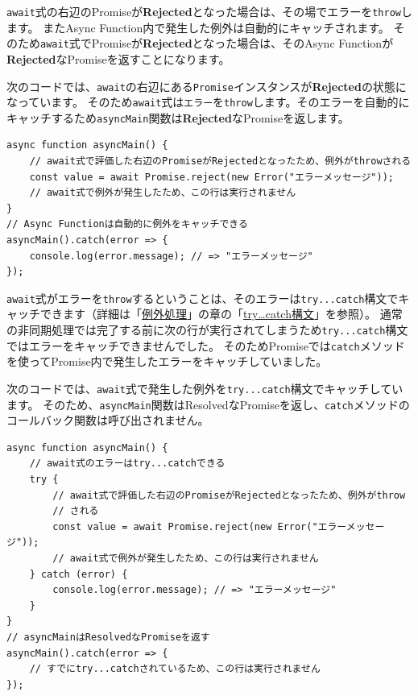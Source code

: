 \texttt{await}式の右辺のPromiseが\textbf{Rejected}となった場合は、その場でエラーを\texttt{throw}します。
またAsync Function内で発生した例外は自動的にキャッチされます。
そのため\texttt{await}式でPromiseが\textbf{Rejected}となった場合は、そのAsync
Functionが\textbf{Rejected}なPromiseを返すことになります。

次のコードでは、\texttt{await}の右辺にある\texttt{Promise}インスタンスが\textbf{Rejected}の状態になっています。
そのため\texttt{await}式は\texttt{エラー}を\texttt{throw}します。そのエラーを自動的にキャッチするため\texttt{asyncMain}関数は\textbf{Rejected}なPromiseを返します。

\begin{lstlisting}
async function asyncMain() {
    // await式で評価した右辺のPromiseがRejectedとなったため、例外がthrowされる
    const value = await Promise.reject(new Error("エラーメッセージ"));
    // await式で例外が発生したため、この行は実行されません
}
// Async Functionは自動的に例外をキャッチできる
asyncMain().catch(error => {
    console.log(error.message); // => "エラーメッセージ"
});
\end{lstlisting}

\texttt{await}式がエラーを\texttt{throw}するということは、そのエラーは\texttt{try...catch}構文でキャッチできます（詳細は「\hyperlink{error-handling}{例外処理}」の章の「\hyperlink{try-catch}{try\ldots{}catch構文}」を参照）。
通常の非同期処理では完了する前に次の行が実行されてしまうため\texttt{try...catch}構文ではエラーをキャッチできませんでした。
そのためPromiseでは\texttt{catch}メソッドを使ってPromise内で発生したエラーをキャッチしていました。

次のコードでは、\texttt{await}式で発生した例外を\texttt{try...catch}構文でキャッチしています。
そのため、\texttt{asyncMain}関数はResolvedなPromiseを返し、\texttt{catch}メソッドのコールバック関数は呼び出されません。

\begin{lstlisting}
async function asyncMain() {
    // await式のエラーはtry...catchできる
    try {
        // await式で評価した右辺のPromiseがRejectedとなったため、例外がthrow
        // される
        const value = await Promise.reject(new Error("エラーメッセージ"));
        // await式で例外が発生したため、この行は実行されません
    } catch (error) {
        console.log(error.message); // => "エラーメッセージ"
    }
}
// asyncMainはResolvedなPromiseを返す
asyncMain().catch(error => {
    // すでにtry...catchされているため、この行は実行されません
});
\end{lstlisting}

